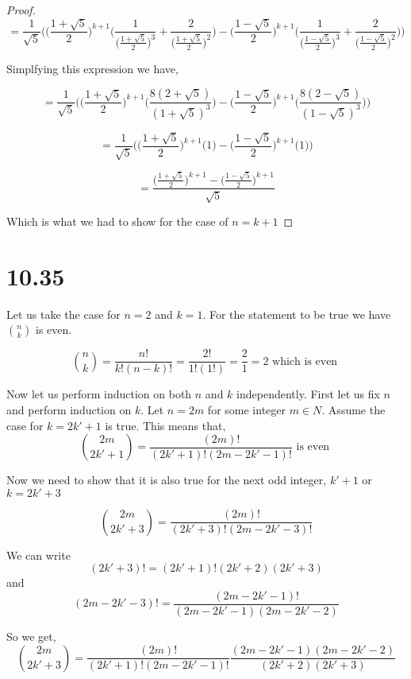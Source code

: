 \documentclass[a4paper]{report}
\begin{document}
\begin{proof}
    $$ = \frac{1}{\sqrt{5}}\bigg(   \bigg (\frac{1 + \sqrt{5}}{2} \bigg )^{k + 1} \bigg( \frac{1}{\bigg (\frac{1 + \sqrt{5}}{2} \bigg )^3}   + \frac{2}{\bigg (\frac{1 + \sqrt{5}}{2} \bigg )^{2}} \bigg) - \bigg (\frac{1 - \sqrt{5}}{2} \bigg )^{k + 1} \bigg( \frac{1}{\bigg (\frac{1 - \sqrt{5}}{2} \bigg )^3}   + \frac{2}{\bigg (\frac{1 - \sqrt{5}}{2} \bigg )^{2}} \bigg) \bigg) $$

    Simplfying this expression we have, 

    $$ = \frac{1}{\sqrt{5}}\bigg(   \bigg (\frac{1 + \sqrt{5}}{2} \bigg )^{k + 1} \bigg(\frac{8( 2 + \sqrt{5})}{(1 + \sqrt{5})^3} \bigg) - \bigg (\frac{1 - \sqrt{5}}{2} \bigg )^{k + 1} \bigg( \frac{8(2 - \sqrt{5})}{(1 - \sqrt{5})^{3}} \bigg) \bigg) $$

    $$ = \frac{1}{\sqrt{5}}\bigg(   \bigg (\frac{1 + \sqrt{5}}{2} \bigg )^{k + 1} \bigg(1\bigg) - \bigg (\frac{1 - \sqrt{5}}{2} \bigg )^{k + 1} \bigg( 1\bigg) \bigg) $$

    $$=  \frac{\big ( \frac{1 + \sqrt{5}}{2}\big)^{k + 1} - \big ( \frac{1 - \sqrt{5}}{2}\big)^{k + 1}}{\sqrt{5}}$$

    Which is what we had to show for the case of $n = k + 1$

\end{proof}

\section*{10.35}

Let us take the case for $n = 2$ and $k = 1$. For the statement to be true we have $n \choose k$ is even.

$$ {n \choose k}  = \frac{n!}{k!(n - k)!} = \frac{2!}{1!(1!)} = \frac{2}{1} = 2 \text{ which is even }$$  

Now let us perform induction on both $n$ and $k$ independently. First let us fix $n$ and perform induction on $k$. Let $n = 2m$ for some integer $m \in N$. Assume the case for $k = 2k' + 1$ is true. This means that, 
$$ {2m \choose 2k' + 1}  = \frac{(2m)!}{(2k' + 1)! (2m - 2k' - 1)!}\text{ is even }$$ 

Now we need to show that it is also true for the next odd integer, $k' + 1$ or  $ k= 2k' + 3$

$$ {2m \choose 2k' + 3}  = \frac{(2m)!}{(2k' + 3)! (2m - 2k' - 3)!}$$ 

We can write $$(2k' + 3)! = (2k' + 1)! (2k' + 2)(2k' + 3)$$ and $$ (2m - 2k' - 3)! =  \frac{(2m - 2k' - 1)!}{ (2m - 2k' - 1) (2m - 2k' - 2)}$$

So we get, 
$$  $$ 
$$ {2m \choose 2k' + 3}  = \frac{(2m)!}{(2k' + 1)! (2m - 2k' - 1)!} \frac{(2m - 2k' - 1) (2m - 2k' - 2)}{(2k' + 2)(2k' + 3)}$$ 





$$  $$ 
\end{document}
